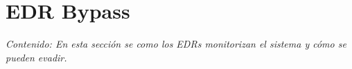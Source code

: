 \chapter{EDR Bypass}

\textit{Contenido: En esta sección se como los EDRs monitorizan el sistema y 
cómo se pueden evadir.}
\vspace{1em}






